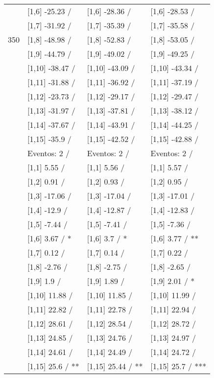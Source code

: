 \begin{table}
\begin{tabular}[t]{llll}
 & {}[1,6] -25.23  / & {}[1,6] -28.36  / & {}[1,6] -28.53  /\\
 & {}[1,7] -31.92  / & {}[1,7] -35.39  / & {}[1,7] -35.58  /\\
350 & {}[1,8] -48.98  / & {}[1,8] -52.83  / & {}[1,8] -53.05  /\\
\addlinespace
 & {}[1,9] -44.79  / & {}[1,9] -49.02  / & {}[1,9] -49.25  /\\
 & {}[1,10] -38.47  / & {}[1,10] -43.09  / & {}[1,10] -43.34  /\\
 & {}[1,11] -31.88  / & {}[1,11] -36.92  / & {}[1,11] -37.19  /\\
 & {}[1,12] -23.73  / & {}[1,12] -29.17  / & {}[1,12] -29.47  /\\
 & {}[1,13] -31.97  / & {}[1,13] -37.81  / & {}[1,13] -38.12  /\\
\addlinespace
 & {}[1,14] -37.67  / & {}[1,14] -43.91  / & {}[1,14] -44.25  /\\
 & {}[1,15] -35.9  / & {}[1,15] -42.52  / & {}[1,15] -42.88  /\\
 & Eventos:  2 / & Eventos:  2 / & Eventos:  2 /\\
 & {}[1,1] 5.55  / & {}[1,1] 5.56  / & {}[1,1] 5.57  /\\
 & {}[1,2] 0.91  / & {}[1,2] 0.93  / & {}[1,2] 0.95  /\\
\addlinespace
 & {}[1,3] -17.06  / & {}[1,3] -17.04  / & {}[1,3] -17.01  /\\
 & {}[1,4] -12.9  / & {}[1,4] -12.87  / & {}[1,4] -12.83  /\\
 & {}[1,5] -7.44  / & {}[1,5] -7.41  / & {}[1,5] -7.36  /\\
 & {}[1,6] 3.67  / * & {}[1,6] 3.7  / * & {}[1,6] 3.77  / **\\
 & {}[1,7] 0.12  / & {}[1,7] 0.14  / & {}[1,7] 0.22  /\\
\addlinespace
500 & {}[1,8] -2.76  / & {}[1,8] -2.75  / & {}[1,8] -2.65  /\\
 & {}[1,9] 1.9  / & {}[1,9] 1.89  / & {}[1,9] 2.01  / *\\
 & {}[1,10] 11.88  / & {}[1,10] 11.85  / & {}[1,10] 11.99  /\\
 & {}[1,11] 22.82  / & {}[1,11] 22.78  / & {}[1,11] 22.94  /\\
 & {}[1,12] 28.61  / & {}[1,12] 28.54  / & {}[1,12] 28.72  /\\
\addlinespace
 & {}[1,13] 24.85  / & {}[1,13] 24.76  / & {}[1,13] 24.97  /\\
 & {}[1,14] 24.61  / & {}[1,14] 24.49  / & {}[1,14] 24.72  /\\
 & {}[1,15] 25.6  / ** & {}[1,15] 25.44  / ** & {}[1,15] 25.7  / ***\\
\bottomrule
\end{tabular}
\end{table}
